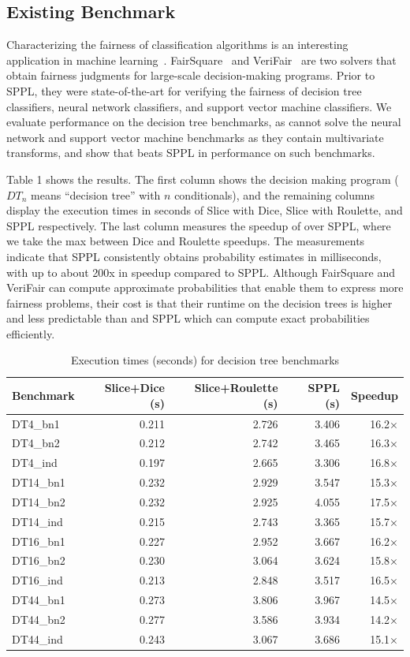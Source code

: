 \subsection{Existing Benchmark}\label{sec:fairness-benchmarks}
Characterizing the fairness of classification algorithms is an interesting application in machine learning~\cite{Dwork2012FairnessAwareness}. FairSquare~\cite{albarghouthi2017fairsquare} and VeriFair~\cite{Bastani2019VeriFair} are two solvers that obtain fairness judgments for large-scale decision-making programs. Prior to SPPL, they were state-of-the-art for verifying the fairness of decision tree classifiers, neural network classifiers, and support vector machine classifiers. We evaluate performance on the decision tree benchmarks, as \Slice cannot solve the neural network and support vector machine benchmarks as they contain multivariate transforms, and show that \Slice{} beats SPPL in performance on such benchmarks.

Table 1 shows the results. The first column shows the decision making program ($DT_n$ means ``decision tree'' with $n$ conditionals), and the remaining columns display the execution times in seconds of Slice with Dice, Slice with Roulette, and SPPL respectively. The last column measures the speedup of \Slice{} over SPPL, where we take the max between Dice and Roulette speedups. The measurements indicate that SPPL consistently obtains probability estimates in milliseconds, with up to about 200x in speedup compared to SPPL. Although FairSquare and VeriFair can compute approximate probabilities that enable them to express more fairness problems, their cost is that their runtime on the decision trees is higher and less predictable than \Slice{} and SPPL which can compute exact probabilities efficiently.

\begin{table}[!t]
\centering
\begin{tabular}{lrrrr}
\toprule
Benchmark & Slice+Dice (s) & Slice+Roulette (s) & SPPL (s) & Speedup \\
\midrule
DT4\_bn1 & 0.211 & 2.726 & 3.406 & 16.2× \\
DT4\_bn2 & 0.212 & 2.742 & 3.465 & 16.3× \\
DT4\_ind & 0.197 & 2.665 & 3.306 & 16.8× \\
DT14\_bn1 & 0.232 & 2.929 & 3.547 & 15.3× \\
DT14\_bn2 & 0.232 & 2.925 & 4.055 & 17.5× \\
DT14\_ind & 0.215 & 2.743 & 3.365 & 15.7× \\
DT16\_bn1 & 0.227 & 2.952 & 3.667 & 16.2× \\
DT16\_bn2 & 0.230 & 3.064 & 3.624 & 15.8× \\
DT16\_ind & 0.213 & 2.848 & 3.517 & 16.5× \\
DT44\_bn1 & 0.273 & 3.806 & 3.967 & 14.5× \\
DT44\_bn2 & 0.277 & 3.586 & 3.934 & 14.2× \\
DT44\_ind & 0.243 & 3.067 & 3.686 & 15.1× \\
\bottomrule
\end{tabular}
\caption{Execution times (seconds) for decision tree benchmarks}
\end{table}

